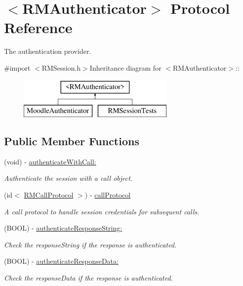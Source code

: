 \hypertarget{protocol_r_m_authenticator-p}{
\section{$<$RMAuthenticator$>$ Protocol Reference}
\label{protocol_r_m_authenticator-p}
}


The authentication provider.  


{\ttfamily \#import $<$RMSession.h$>$}Inheritance diagram for $<$RMAuthenticator$>$::\begin{figure}[H]
\begin{center}
\leavevmode
\includegraphics[height=2cm]{protocol_r_m_authenticator-p}
\end{center}
\end{figure}
\subsection*{Public Member Functions}
\begin{DoxyCompactItemize}
\item 
(void) -\/ \hyperlink{protocol_r_m_authenticator-p_acec2e6c190f5719f5e9184938e50aa43}{authenticateWithCall:}
\begin{DoxyCompactList}\small\item\em Authenticate the session with a call object. \item\end{DoxyCompactList}\item 
(id$<$ \hyperlink{protocol_r_m_call_protocol-p}{RMCallProtocol} $>$) -\/ \hyperlink{protocol_r_m_authenticator-p_a1a8ee1ab6eb4014dd3783e096173f000}{callProtocol}
\begin{DoxyCompactList}\small\item\em A call protocol to handle session credentials for subsequent calls. \item\end{DoxyCompactList}\item 
(BOOL) -\/ \hyperlink{protocol_r_m_authenticator-p_adf5dc80e89981e86b61d1720ad441c79}{authenticateResponseString:}
\begin{DoxyCompactList}\small\item\em Check the responseString if the response is authenticated. \item\end{DoxyCompactList}\item 
(BOOL) -\/ \hyperlink{protocol_r_m_authenticator-p_aa82480a76b720c6497425661de692eea}{authenticateResponseData:}
\begin{DoxyCompactList}\small\item\em Check the responseData if the response is authenticated. \item\end{DoxyCompactList}\end{DoxyCompactItemize}


